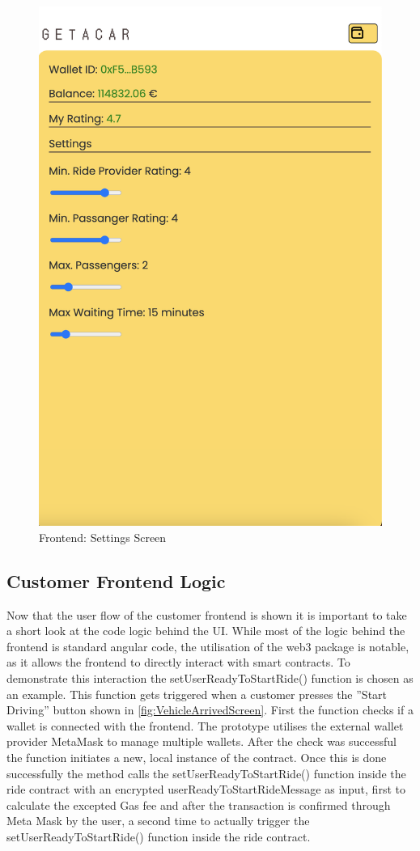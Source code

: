 \begin{figure}[H]
    \centering
    \includegraphics[width=0.45\linewidth]{data/ffss/13.png}
    \caption{Frontend: Settings Screen}
    \label{fig:SettingsScreen}
\end{figure}


\subsection{Customer Frontend Logic}
Now that the user flow of the customer frontend is shown it is important to take a short look at the code logic behind the UI. While most of the logic behind the frontend is standard angular code, the utilisation of the web3 package is notable, as it allows the frontend to directly interact with smart contracts. To demonstrate this interaction the setUserReadyToStartRide() function is chosen as an example. This function gets triggered when a customer presses the ''Start Driving'' button shown in \ref{fig:VehicleArrivedScreen}. First the function checks if a wallet is connected with the frontend. The prototype utilises the external wallet provider MetaMask to manage multiple wallets. After the check was successful the function initiates a new, local instance of the contract. Once this is done successfully the method calls the setUserReadyToStartRide() function inside the ride contract with an encrypted userReadyToStartRideMessage as input, first to calculate the excepted Gas fee and after the transaction is confirmed through Meta Mask by the user, a second time to actually trigger the setUserReadyToStartRide() function inside the ride contract.


